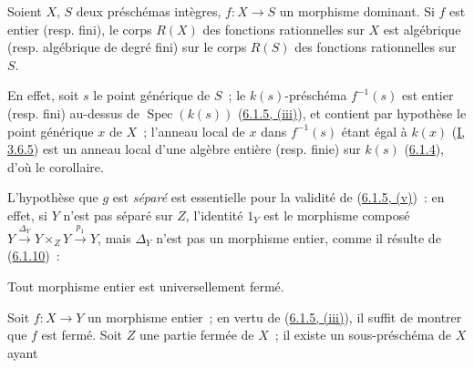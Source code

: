 \begin{corollary}[6.1.8]
\label{II.6.1.8-fr}
Soient $X$, $S$ deux préschémas intègres, $f:X\to S$ un morphisme dominant. Si
$f$ est entier (resp. fini), le corps $R(X)$ des fonctions rationnelles sur
$X$ est algébrique (resp. algébrique de degré fini) sur le corps $R(S)$ des
fonctions rationnelles sur $S$.
\end{corollary}

En effet, soit $s$ le point générique de $S$~; le $k(s)$-préschéma
$f^{-1}(s)$ est entier (resp. fini) au-dessus de
$\operatorname{Spec}(k(s))$ (\hyperref[II.6.1.5-fr]{6.1.5, (iii)}), et
contient par hypothèse le point générique $x$ de $X$~; l'anneau local de $x$
dans $f^{-1}(s)$ étant égal à $k(x)$ (\hyperref[I.3.6.5-fr]{I, 3.6.5}) est un
anneau local d'une algèbre entière (resp. finie) sur $k(s)$
(\hyperref[II.6.1.4-fr]{6.1.4}), d'où le corollaire.

\begin{remark}[6.1.9]
\label{II.6.1.9-fr}
L'hypothèse que $g$ est \emph{séparé} est essentielle pour la validité de
(\hyperref[II.6.1.5-fr]{6.1.5, (v)})~: en effet, si $Y$ n'est pas séparé sur
$Z$, l'identité $1_Y$ est le morphisme composé
$Y\xrightarrow{\Delta_Y}Y\times_ZY\xrightarrow{p_1}Y$, mais $\Delta_Y$ n'est
pas un morphisme entier, comme il résulte de
(\hyperref[II.6.1.10-fr]{6.1.10})~:
\end{remark}

\begin{proposition}[6.1.10]
\label{II.6.1.10-fr}
Tout morphisme entier est universellement fermé.
\end{proposition}

Soit $f:X\to Y$ un morphisme entier~; en vertu de
(\hyperref[II.6.1.5-fr]{6.1.5, (iii)}), il suffit de montrer que $f$ est
fermé. Soit $Z$ une partie fermée de $X$~; il existe un sous-préschéma de $X$
ayant

